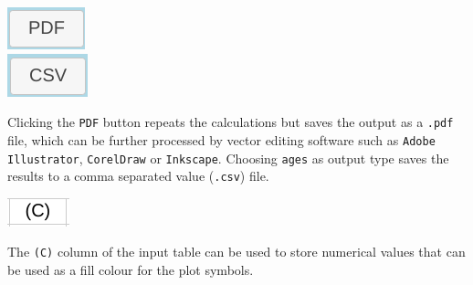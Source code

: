 \begin{refsection}
\noindent\begin{minipage}[t]{.15\textwidth}
\strut\vspace*{-\baselineskip}\newline
\includegraphics[width=.55\textwidth]{../figures/PDF.png}\\
\includegraphics[width=.55\textwidth]{../figures/CSV.png}\\
\end{minipage}
\begin{minipage}[t]{.85\textwidth}
Clicking the \texttt{PDF} button repeats the calculations but saves
the output as a \texttt{.pdf} file, which can be further processed by
vector editing software such as \texttt{Adobe Illustrator},
\texttt{CorelDraw} or \texttt{Inkscape}. Choosing \texttt{ages} as
output type saves the results to a comma separated value
(\texttt{.csv}) file.\\
\end{minipage}

\noindent\begin{minipage}[t]{.15\textwidth}
\strut\vspace*{-\baselineskip}\newline
\includegraphics[width=.55\textwidth]{../figures/C.png}\\
\end{minipage}
\begin{minipage}[t]{.85\textwidth}
The \texttt{(C)} column of the input table can be used to store
numerical values that can be used as a fill colour for the plot
symbols.\\
\end{minipage}


\end{refsection}
